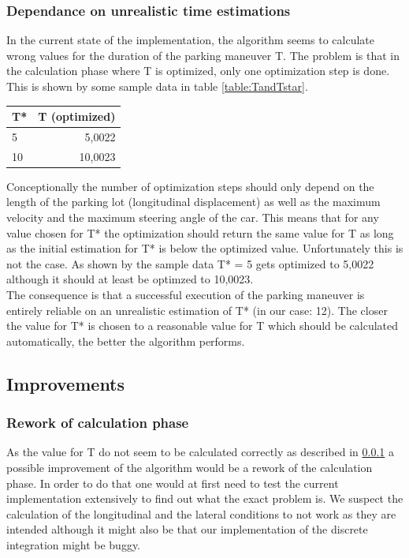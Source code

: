 \documentclass[paper=a4, fontsize=11pt]{scrreprt}
\begin{document}
\subsubsection{Dependance on unrealistic time estimations} \label{dependance}
In the current state of the implementation, the algorithm seems to calculate wrong values for the duration of the parking maneuver T. The problem is that in the calculation phase where T is optimized, only one optimization step is done. This is shown by some sample data in table \ref{table:TandTstar}.
\begin{center}
\label{table:TandTstar}
  \begin{tabular}{  l | r }
    T* & T (optimized) \\
    \hline
    \hline
    5 & 5,0022 \\
    \hline
    10 & 10,0023 \\
    \hline
  \end{tabular}
\end{center}
Conceptionally the number of optimization steps should only depend on the length of the parking lot (longitudinal displacement) as well as the maximum velocity and the maximum steering angle of the car. This means that for any value chosen for T* the optimization should return the same value for T as long as the initial estimation for T* is below the optimized value. Unfortunately this is not the case. As shown by the sample data T* = 5 gets optimized to 5,0022 although it should at least be optimzed to 10,0023.\\
The consequence is that a successful execution of the parking maneuver is entirely reliable on an unrealistic estimation of T* (in our case: 12). The closer the value for T* is chosen to a reasonable value for T which should be calculated automatically, the better the algorithm performs.
\subsection{Improvements}
\subsubsection{Rework of calculation phase} \label{rework}
As the value for T do not seem to be calculated correctly as described in \ref{dependance} a possible improvement of the algorithm would be a rework of the calculation phase. In order to do that one would at first need to test the current implementation extensively to find out what the exact problem is. We suspect the calculation of the longitudinal and the lateral conditions to not work as they are intended although it might also be that our implementation of the discrete integration might be buggy.
\end{document}
